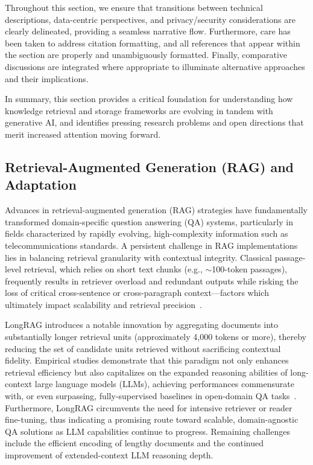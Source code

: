 \documentclass[sigconf]{acmart}
\begin{document}
Throughout this section, we ensure that transitions between technical descriptions, data-centric perspectives, and privacy/security considerations are clearly delineated, providing a seamless narrative flow. Furthermore, care has been taken to address citation formatting, and all references that appear within the section are properly and unambiguously formatted. Finally, comparative discussions are integrated where appropriate to illuminate alternative approaches and their implications.

In summary, this section provides a critical foundation for understanding how knowledge retrieval and storage frameworks are evolving in tandem with generative AI, and identifies pressing research problems and open directions that merit increased attention moving forward.

\subsection{Retrieval-Augmented Generation (RAG) and Adaptation}

Advances in retrieval-augmented generation (RAG) strategies have fundamentally transformed domain-specific question answering (QA) systems, particularly in fields characterized by rapidly evolving, high-complexity information such as telecommunications standards. A persistent challenge in RAG implementations lies in balancing retrieval granularity with contextual integrity. Classical passage-level retrieval, which relies on short text chunks (e.g., \(\sim\)100-token passages), frequently results in retriever overload and redundant outputs while risking the loss of critical cross-sentence or cross-paragraph context---factors which ultimately impact scalability and retrieval precision~\cite{ref34}.

LongRAG introduces a notable innovation by aggregating documents into substantially longer retrieval units (approximately 4,000 tokens or more), thereby reducing the set of candidate units retrieved without sacrificing contextual fidelity. Empirical studies demonstrate that this paradigm not only enhances retrieval efficiency but also capitalizes on the expanded reasoning abilities of long-context large language models (LLMs), achieving performances commensurate with, or even surpassing, fully-supervised baselines in open-domain QA tasks~\cite{ref34}. Furthermore, LongRAG circumvents the need for intensive retriever or reader fine-tuning, thus indicating a promising route toward scalable, domain-agnostic QA solutions as LLM capabilities continue to progress. Remaining challenges include the efficient encoding of lengthy documents and the continued improvement of extended-context LLM reasoning depth.
\end{document}

